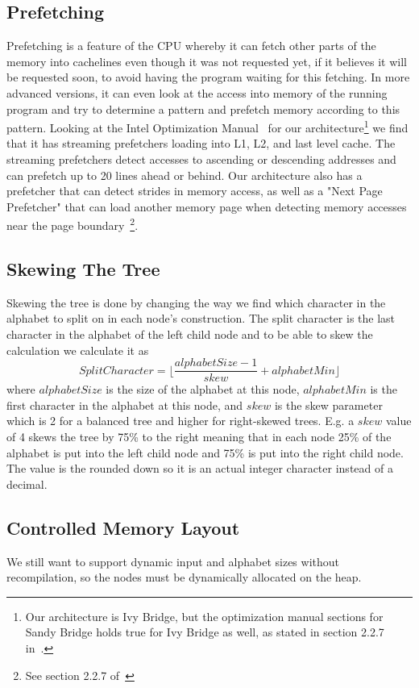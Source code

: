 \subsection{Prefetching}
Prefetching is a feature of the CPU whereby it can fetch other parts of the memory into cachelines even though it was not requested yet, if it believes it will be requested soon, to avoid having the program waiting for this fetching.
In more advanced versions, it can even look at the access into memory of the running program and try to determine a pattern and prefetch memory according to this pattern.
Looking at the Intel Optimization Manual~ for our architecture\footnote{Our architecture is Ivy Bridge, but the optimization manual sections for Sandy Bridge holds true for Ivy Bridge as well, as stated in section 2.2.7 in~.} we find that it has streaming prefetchers loading into L1, L2, and last level cache. The streaming prefetchers detect accesses to ascending or descending addresses and can prefetch up to 20 lines ahead or behind. 
Our architecture also has a prefetcher that can detect strides in memory access, as well as a "Next Page Prefetcher" that can load another memory page when detecting memory accesses near the page boundary~\footnote{See section 2.2.7 of~}.


\subsection{Skewing The Tree}
\label{sec:SkewingTheTree}
Skewing the tree is done by changing the way we find which character in the alphabet to split on in each node's construction.
The split character is the last character in the alphabet of the left child node and to be able to skew the calculation we calculate it as
\[SplitCharacter = \lfloor \frac{alphabetSize-1}{skew} + alphabetMin \rfloor \]
where $alphabetSize$ is the size of the alphabet at this node, $alphabetMin$ is the first character in the alphabet at this node, and $skew$ is the skew parameter which is 2 for a balanced tree and higher for right-skewed trees. E.g. a $skew$ value of 4 skews the tree by 75\% to the right meaning that in each node 25\% of the alphabet is put into the left child node and 75\% is put into the right child node.
The value is the rounded down so it is an actual integer character instead of a decimal.


\subsection{Controlled Memory Layout}
We still want to support dynamic input and alphabet sizes without recompilation, so the nodes must be dynamically allocated on the heap.

